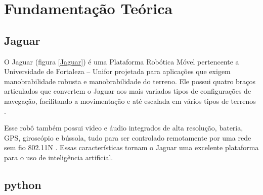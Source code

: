 \chapter{Fundamentação Teórica}
\label{cap:fundamentacao-teorica}

\section{Jaguar}
\label{sec:jaguar}

 O Jaguar (figura \ref{Jaguar}) é uma Plataforma Robótica Móvel pertencente a Universidade de Fortaleza – Unifor projetada para aplicações que exigem manobrabilidade robusta e manobrabilidade do terreno. Ele possui quatro braços articulados que convertem o Jaguar aos mais variados tipos de configurações de navegação, facilitando a movimentação e até escalada em vários tipos de terrenos \cite{jaguar}. 

Esse robô também possui video e áudio integrados de alta resolução, bateria, GPS, giroscópio e bússola, tudo para ser controlado remotamente por uma rede sem fio 802.11N \cite{jaguar}. 
Essas características tornam o Jaguar uma excelente plataforma para o uso de inteligência artificial. 

	\begin{figure}[H]
		\centering
\end{figure}

\section{python}
\label{sec:python}

